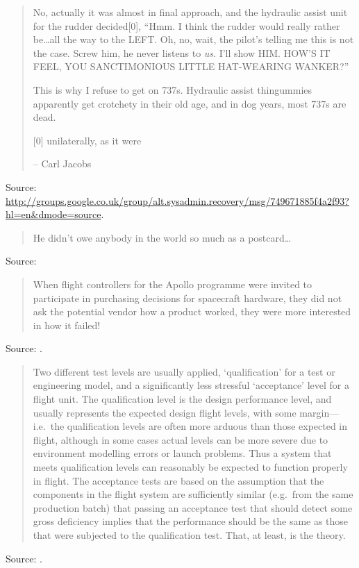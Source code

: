 \documentclass[a4paper]{article}
\begin{document}
\begin{quote}
No, actually it was almost in final approach, and the hydraulic assist
unit for the rudder decided[0], ``Hmm.  I think the rudder would really
rather be\ldots all the way to the LEFT.  Oh, no, wait, the pilot's
telling me this is not the case.  Screw him, he never listens to \emph{us}.
I'll show HIM.  HOW'S IT FEEL, YOU SANCTIMONIOUS LITTLE HAT-WEARING
WANKER?''

This is why I refuse to get on 737s.  Hydraulic assist thingummies
apparently get crotchety in their old age, and in dog years, most 737s
are dead.

[0] unilaterally, as it were

-- 
Carl Jacobs
\end{quote}
Source: \url{http://groups.google.co.uk/group/alt.sysadmin.recovery/msg/749671885f4a2f93?hl=en&dmode=source}.
\medskip

\begin{quote}
	He didn't owe anybody in the world so much as a postcard\ldots
\end{quote}
Source: \citet[p.~254]{Thompson1988}
\medskip

\begin{quote}
	When flight controllers for the Apollo programme were invited
	to participate in purchasing decisions for spacecraft hardware,
	they did not ask the potential vendor how a product worked,
	they were more interested in how it failed!
\end{quote}
Source: \citet[p.~352]{Harland2005}.
\medskip

\begin{quote}
	Two different test levels are usually applied, `qualification' for
	a test or engineering model, and a significantly less stressful
	`acceptance' level for a flight unit.  The qualification level
	is the design performance level, and usually represents the
	expected design flight levels, with some margin---i.e.\ the
	qualification levels are often more arduous than those expected
	in flight, although in some cases actual levels can be more
	severe due to environment modelling errors or launch problems.
	Thus a system that meets qualification levels can reasonably be
	expected to function properly in flight.  The acceptance tests
	are based on the assumption that the components in the flight
	system are sufficiently similar (e.g.\ from the same production
	batch) that passing an acceptance test that should detect some
	gross deficiency implies that the performance should be the
	same as those that were subjected to the qualification test.
	That, at least, is the theory.
\end{quote}
Source: \citet[pp.~327--8]{Harland2005}.
\medskip
\end{document}
